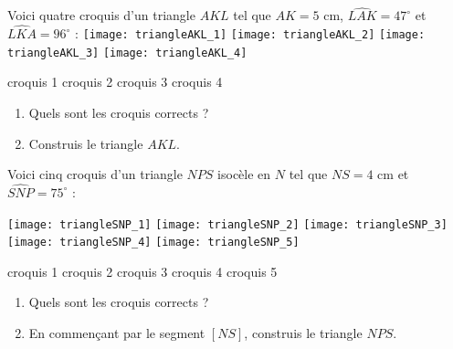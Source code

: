 \begin{activite}

Voici quatre croquis d'un triangle $AKL$ tel que $AK = 5$ cm, $\widehat{LAK} = 47^\circ$ et $\widehat{LKA} = 96^\circ$ :
\texttt{[image: triangleAKL\_1]} \hfill \texttt{[image: triangleAKL\_2]} \hfill \texttt{[image: triangleAKL\_3]} \hfill \texttt{[image: triangleAKL\_4]}

\qquad croquis 1 \hfill croquis 2 \hfill croquis 3 \hfill croquis 4 \hfill \\[0.2em]

\begin{enumerate}

\item Quels sont les croquis corrects ?  \dotfill

\item Construis le triangle $AKL$.
\end{enumerate}

\end{activite}



\begin{activite}

Voici cinq croquis d'un triangle $NPS$ isocèle en $N$ tel que $NS = 4$ cm et $\widehat{SNP} = 75^\circ$ :

\texttt{[image: triangleSNP\_1]} \hfill \texttt{[image: triangleSNP\_2]} \hfill \texttt{[image: triangleSNP\_3]} \hfill \texttt{[image: triangleSNP\_4]} \hfill \texttt{[image: triangleSNP\_5]} 

\quad croquis 1 \hfill croquis 2 \hfill croquis 3 \hfill croquis 4 \hfill croquis 5 \\[0.2em]

\begin{enumerate}

\item Quels sont les croquis corrects ? \dotfill

\item En commençant par le segment $[NS]$, construis le triangle $NPS$.
\end{enumerate}

\end{activite}
